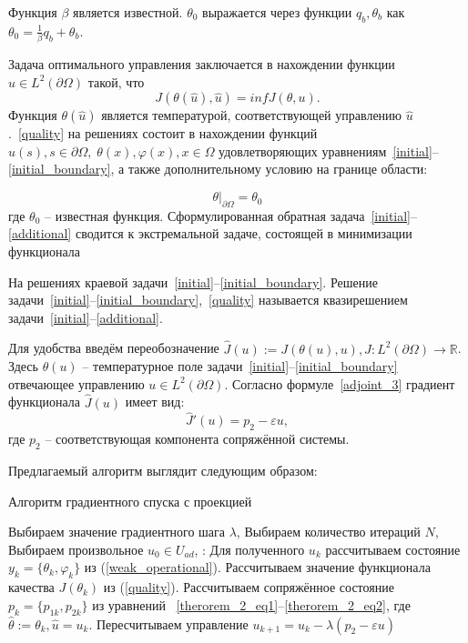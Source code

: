 \documentclass[10pt]{article}
\begin{document}
    Функция $\beta$ является известной. $\theta_0$ выражается
    через функции $q_b, \theta_b$ как $\theta_0 = \frac{1}{\beta}q_b + \theta_b$.

    Задача оптимального управления заключается в нахождении функции $\hat u \in L^2(\partial \Omega)$ такой, что
    \[J(\theta(\hat u), \hat u) = inf J(\theta, u).\]
    Функция $\theta(\hat u)$ является температурой, соответствующей управлению
    $\hat u$.~\eqref{quality} на решениях состоит в нахождении функций
    $u(s), s \in \partial \Omega,\; \theta(x), \varphi(x), x \in \Omega$ удовлетворяющих
    уравнениям~\eqref{initial}--\eqref{initial_boundary}, а также дополнительному условию на границе области:

    \begin{equation}
        \label{additional}
        \theta|_{\partial \Omega} = \theta_0
    \end{equation}
    где $\theta_0$ -- известная функция.
    Сформулированная обратная задача~\eqref{initial}--\eqref{additional} сводится к экстремальной задаче,
    состоящей в минимизации функционала

    На решениях краевой задачи~\eqref{initial}--\eqref{initial_boundary}.
    Решение задачи~\eqref{initial}--\eqref{initial_boundary},~\eqref{quality}
    называется квазирешением задачи~\eqref{initial}--\eqref{additional}.

    Для удобства введём переобозначение
    $\hat{J}(u):=J(\theta(u),u), \hat{J}:L^2(\partial \Omega) \to \mathbb{R}$.
    Здесь $\theta(u)$ -- температурное поле задачи~\eqref{initial}--\eqref{initial_boundary}
    отвечающее управлению $u \in L^2(\partial \Omega)$.
    Согласно формуле~\eqref{adjoint_3} градиент функционала $\hat J(u)$ имеет вид:
    \begin{equation}
        \label{j_gradient}
        \hat J'(u) = p_2 - \varepsilon u,
    \end{equation}
    где $p_2$ -- соответствующая компонента сопряжённой системы.

    Предлагаемый алгоритм выглядит следующим образом:
    \begin{algorithm}[H]
        \caption{Алгоритм градиентного спуска с проекцией}
        \begin{algorithmic}[1]
            \State Выбираем значение градиентного шага $\lambda$,
            \State Выбираем количество итераций $N$,
            \State Выбираем произвольное $u_0 \in U_{ad}$,
            :
            \State Для полученного $u_k$ рассчитываем состояние
            $y_k = \{\theta_k, \varphi_k\}$ из  (\ref{weak_operational}).
            \State Рассчитываем значение функционала качества $J(\theta_k)$ из (\ref{quality}).
            \State Рассчитываем сопряжённое состояние $p_k=\{p_{1k},p_{2k}\}$ из уравнений
            ~\eqref{therorem_2_eq1}--\eqref{therorem_2_eq2}, где $ \hat{\theta} := \theta_k, \hat{u}=u_k$.
            \State Пересчитываем управление $u_{k+1} = u_k - \lambda (p_2 - \varepsilon u)$
            \EndFor
        \end{algorithmic}
    \end{algorithm}
\end{document}
